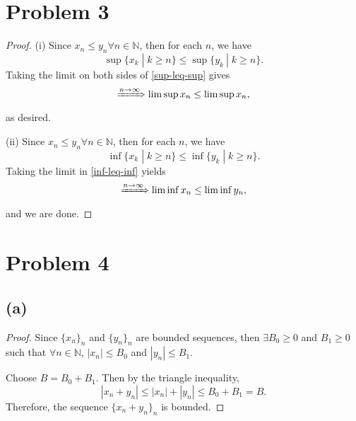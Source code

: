 \documentclass{article}
\begin{document}
\section*{Problem 3}
\begin{proof}
	(i) Since $x_n \leq y_n \forall n\in\mathbb{N}$, then for each $n$, we have
	\begin{equation}\label{sup-leq-sup}
		\sup \{x_k \;|\; k\geq n\} \leq \sup \{y_k \:|\; k\geq n\}.
	\end{equation}
	Taking the limit on both sides of \eqref{sup-leq-sup} gives
	\begin{equation}
		\xRightarrow{n\to\infty} \limsup x_n \leq \limsup x_n,
	\end{equation}
	as desired.
	
	(ii) Since $x_n \leq y_n \forall n \in \mathbb{N}$, then for each $n$, we have
	\begin{equation}\label{inf-leq-inf}
		\inf\{x_k \;|\; k\geq n\} \leq \inf \{y_k \;|\; k\geq n\}.
	\end{equation}
	Taking the limit in \eqref{inf-leq-inf} yields
	\begin{equation}
		\xRightarrow{n \to\infty} \liminf x_n \leq \liminf y_n,
	\end{equation}
	and we are done.
\end{proof}
\section*{Problem 4}
\subsection*{(a)}
\begin{proof}
	Since $\{x_n\}_n$ and $\{y_n\}_n$ are bounded sequences, then $\exists B_0 \geq 0$ and $B_1 \geq 0$ such that $\forall n \in \mathbb{N}$, $|x_n| \leq B_0$ and $|y_n| \leq B_1$.
	
	Choose $B = B_0 + B_1$. Then by the triangle inequality,
	\begin{equation}
		|x_n + y_n| \leq |x_n| + |y_n| \leq B_0 + B_1 = B.
	\end{equation}
	Therefore, the sequence $\{x_n + y_n\}_n$ is bounded.
\end{proof}


\end{document}
